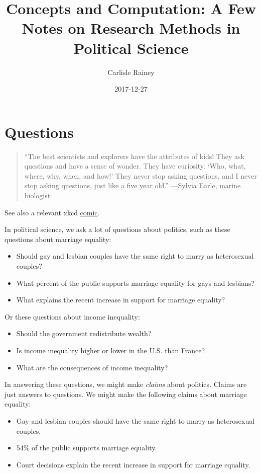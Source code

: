 \documentclass[]{book}
\title{Concepts and Computation: A Few Notes on Research Methods in Political
Science}
\author{Carlisle Rainey}
\date{2017-12-27}
\providecommand{\tightlist}{%
  \setlength{\itemsep}{0pt}\setlength{\parskip}{0pt}}
\theoremstyle{definition}
\theoremstyle{definition}
\theoremstyle{definition}
\theoremstyle{remark}
\begin{document}
\maketitle

{
\setcounter{tocdepth}{1}
\tableofcontents
}
\chapter{Questions}\label{questions}

\begin{quote}
``The best scientists and explorers have the attributes of kids! They
ask questions and have a sense of wonder. They have curiosity. `Who,
what, where, why, when, and how!' They never stop asking questions, and
I never stop asking questions, just like a five year old.'' ---Sylvia
Earle, marine biologist
\end{quote}

See also a relevant xkcd \href{https://xkcd.com/242/}{comic}.

In political science, we ask a lot of questions about politics, such as
these questions about marriage equality:

\begin{itemize}
\tightlist
\item
  Should gay and lesbian couples have the same right to marry as
  heterosexual couples?
\item
  What percent of the public supports marriage equality for gays and
  lesbians?
\item
  What explains the recent increase in support for marriage equality?
\end{itemize}

Or these questions about income inequality:

\begin{itemize}
\tightlist
\item
  Should the government redistribute wealth?
\item
  Is income inequality higher or lower in the U.S. than France?
\item
  What are the consequences of income inequality?
\end{itemize}

In answering these questions, we might make \emph{claims} about
politics. Claims are just answers to questions. We might make the
following claims about marriage equality:

\begin{itemize}
\tightlist
\item
  Gay and lesbian couples should have the same right to marry as
  heterosexual couples.
\item
  54\% of the public supports marriage equality.
\item
  Court decisions explain the recent increase in support for marriage
  equality.
\end{itemize}
\end{document}
